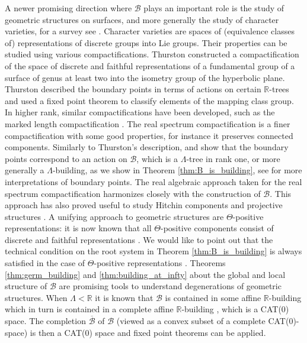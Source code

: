 \documentclass[12pt]{amsart}
\newcommand{\R}{\mathbb{R} }
\newcommand{\B}{\mathcal{B}}
\numberwithin{equation}{section}
\theoremstyle{remark} %
\begin{document}
A newer promising direction where $\B$ plays an important role is the study of geometric structures on surfaces, and more generally the study of character varieties, for a survey see \cite{Wie18}. Character varieties are spaces of (equivalence classes of) representations of discrete groups into Lie groups. Their properties can be studied using various compactifications. Thurston \cite{Thu88} constructed a compactification of the space of discrete and faithful representations of a fundamental group of a surface of genus at least two into the isometry group of the hyperbolic plane. Thurston described the boundary points in terms of actions on certain $\R$-trees and used a fixed point theorem to classify elements of the mapping class group. In higher rank, similar compactifications have been developed, such as the marked length compactification \cite{Bon88,Par12}. The real spectrum compactification \cite{Bru1,BIPP21,BIPP23arxiv} is a finer compactification with some good properties, for instance it preserves connected components. Similarly to Thurston's description, \cite{Bru1,Bru2} and \cite[Theorem 1.1]{BIPP23arxiv} show that the boundary points correspond to an action on $\B$, which is a $\Lambda$-tree in rank one, or more generally a $\Lambda$-building, as we show in Theorem \ref{thm:B_is_building}, see \cite{Jae25arxiv} for more interpretations of boundary points. The real algebraic approach taken for the real spectrum compactification harmonizes closely with the construction of $\B$. This approach has also proved useful to study Hitchin components and projective structures \cite{Fla22arxiv,FlPa25arxiv}. A unifying approach to geometric structures are $\Theta$-positive representations: it is now known that all $\Theta$-positive components consist of discrete and faithful representations \cite{BGLPW24}. We would like to point out that the technical condition on the root system in Theorem \ref{thm:B_is_building} is always satisfied in the case of $\Theta$-positive representations \cite{GuWi24}.  Theorems \ref{thm:germ_building} and \ref{thm:building_at_infty} about the global and local structure of $\B$ are promising tools to understand degenerations of geometric structures. When $\Lambda < \R$ it is known that $\B$ is contained in some affine $\R$-building \cite{ScSt12} which in turn is contained in a complete affine $\R$-building \cite[Lemma 4.4]{Str11}, which is a CAT(0) space. The completion $\overline{\B}$ of $\B$ (viewed as a convex subset of a complete CAT(0)-space) is then a CAT(0) space and fixed point theorems can be applied.
\end{document}
